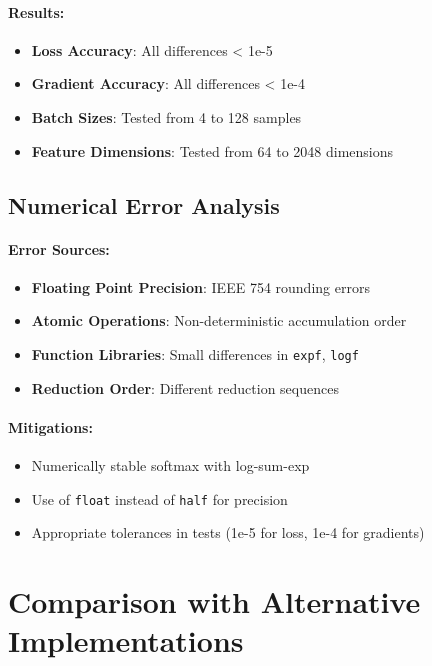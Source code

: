 \documentclass[a4paper,11pt]{article}
\begin{document}
\paragraph{Results:}
\begin{itemize}
    \item \textbf{Loss Accuracy}: All differences < 1e-5
    \item \textbf{Gradient Accuracy}: All differences < 1e-4
    \item \textbf{Batch Sizes}: Tested from 4 to 128 samples
    \item \textbf{Feature Dimensions}: Tested from 64 to 2048 dimensions
\end{itemize}

\subsection{Numerical Error Analysis}

\paragraph{Error Sources:}
\begin{itemize}
    \item \textbf{Floating Point Precision}: IEEE 754 rounding errors
    \item \textbf{Atomic Operations}: Non-deterministic accumulation order
    \item \textbf{Function Libraries}: Small differences in \texttt{expf}, \texttt{logf}
    \item \textbf{Reduction Order}: Different reduction sequences
\end{itemize}

\paragraph{Mitigations:}
\begin{itemize}
    \item Numerically stable softmax with log-sum-exp
    \item Use of \texttt{float} instead of \texttt{half} for precision
    \item Appropriate tolerances in tests (1e-5 for loss, 1e-4 for gradients)
\end{itemize}

\section{Comparison with Alternative Implementations}
\end{document}
